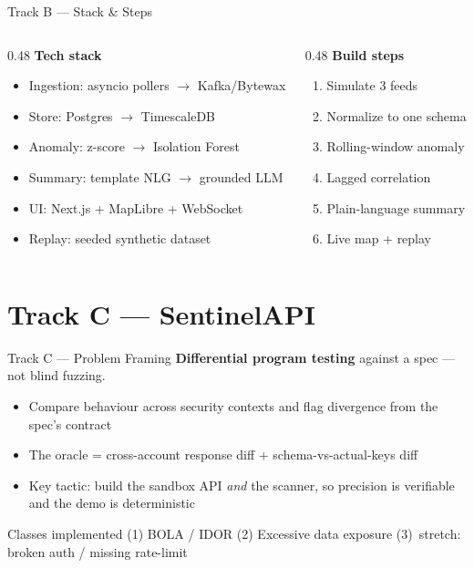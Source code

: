 \documentclass[10pt,aspectratio=169]{beamer}
\begin{document}
\begin{frame}{Track B — Stack \& Steps}
  \begin{columns}[T]
    \begin{column}{0.48\textwidth}
      \textbf{Tech stack}
      \begin{itemize}\small
        \item Ingestion: asyncio pollers $\to$ Kafka/Bytewax
        \item Store: Postgres $\to$ TimescaleDB
        \item Anomaly: z-score $\to$ Isolation Forest
        \item Summary: template NLG $\to$ grounded LLM
        \item UI: Next.js + MapLibre + WebSocket
        \item Replay: seeded synthetic dataset
      \end{itemize}
    \end{column}
    \begin{column}{0.48\textwidth}
      \textbf{Build steps}
      \begin{enumerate}\small
        \item Simulate 3 feeds
        \item Normalize to one schema
        \item Rolling-window anomaly
        \item Lagged correlation
        \item Plain-language summary
        \item Live map + replay
      \end{enumerate}
    \end{column}
  \end{columns}
\end{frame}

\section{Track C — SentinelAPI}

\begin{frame}{Track C — Problem Framing}
  \textbf{Differential program testing} against a spec — not blind fuzzing.
  \begin{itemize}
    \item Compare \alert{behaviour across security contexts} and flag divergence
      from the spec's contract
    \item The oracle = cross-account response diff + schema-vs-actual-keys diff
    \item \alert{Key tactic}: build the sandbox API \emph{and} the scanner, so
      precision is verifiable and the demo is deterministic
  \end{itemize}
  \begin{block}{Classes implemented}
    (1) BOLA / IDOR \quad (2) Excessive data exposure \quad (3)~stretch: broken auth / missing rate-limit
  \end{block}
\end{frame}
\end{document}
